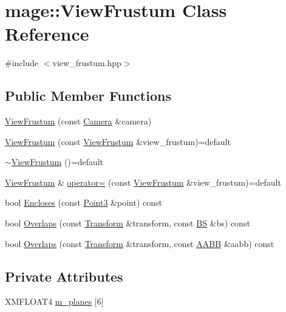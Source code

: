 \hypertarget{classmage_1_1_view_frustum}{}\section{mage\+:\+:View\+Frustum Class Reference}
\label{classmage_1_1_view_frustum}


{\ttfamily \#include $<$view\+\_\+frustum.\+hpp$>$}

\subsection*{Public Member Functions}
\begin{DoxyCompactItemize}
\item 
\hyperlink{classmage_1_1_view_frustum_ad1fd4a59f6cd0fd38289e66d4c6b5d51}{View\+Frustum} (const \hyperlink{classmage_1_1_camera}{Camera} \&camera)
\item 
\hyperlink{classmage_1_1_view_frustum_abbd4ec6c2766d3f630bce16cefa8bc4d}{View\+Frustum} (const \hyperlink{classmage_1_1_view_frustum}{View\+Frustum} \&view\+\_\+frustum)=default
\item 
\hyperlink{classmage_1_1_view_frustum_aaa0e10f5401370909694e923c58323a9}{$\sim$\+View\+Frustum} ()=default
\item 
\hyperlink{classmage_1_1_view_frustum}{View\+Frustum} \& \hyperlink{classmage_1_1_view_frustum_add514821f691117c0ab139c13f86ef70}{operator=} (const \hyperlink{classmage_1_1_view_frustum}{View\+Frustum} \&view\+\_\+frustum)=default
\item 
bool \hyperlink{classmage_1_1_view_frustum_a290ee7b311278ed4701203859773aa42}{Encloses} (const \hyperlink{structmage_1_1_point3}{Point3} \&point) const
\item 
bool \hyperlink{classmage_1_1_view_frustum_ab45ef542b3bacf16390a8f223472bcd5}{Overlaps} (const \hyperlink{structmage_1_1_transform}{Transform} \&transform, const \hyperlink{structmage_1_1_b_s}{BS} \&bs) const
\item 
bool \hyperlink{classmage_1_1_view_frustum_a302c7b49592bc9e5a297270da0c8b6ec}{Overlaps} (const \hyperlink{structmage_1_1_transform}{Transform} \&transform, const \hyperlink{structmage_1_1_a_a_b_b}{A\+A\+BB} \&aabb) const
\end{DoxyCompactItemize}
\subsection*{Private Attributes}
\begin{DoxyCompactItemize}
\item 
X\+M\+F\+L\+O\+A\+T4 \hyperlink{classmage_1_1_view_frustum_aa5d8b90bfc005bd19566983401ccd511}{m\+\_\+planes} \mbox{[}6\mbox{]}
\end{DoxyCompactItemize}


